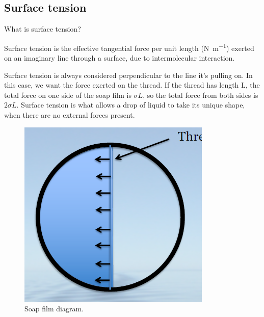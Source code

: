 \documentclass[class=report, crop=false, 12pt,a4paper]{standalone}
\numberwithin{equation}{section}
\begin{document}
\subsection{Surface tension}
What is surface tension?
\begin{center}
  Surface tension is the effective tangential force per unit length (\si{\newton\per\meter}) exerted on an imaginary line through a surface, due to intermolecular interaction.
\end{center}
Surface tension is always considered perpendicular to the line it's pulling on. In this case, we want the force exerted on the thread. If the thread has length L, the total force on one side of the soap film is \(\sigma L\), so the total force from both sides is \(2\sigma L\). Surface tension is what allows a drop of liquid to take its unique shape, when there are no external forces present.
\begin{figure}[h!]
  \centering
  \includegraphics[width = 0.4 \textwidth]{../img/SoapFilm}
  \caption{Soap film diagram.}
\end{figure}
\end{document}
